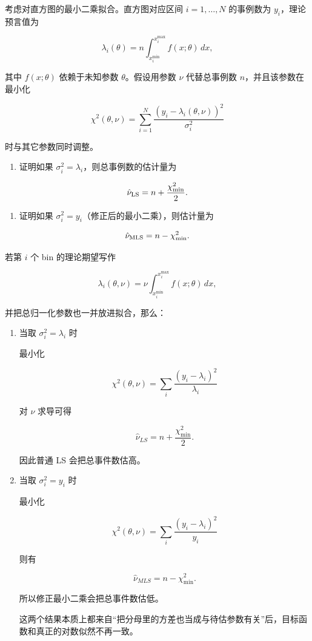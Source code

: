 \begin{question}
考虑对直方图的最小二乘拟合。直方图对应区间 \(i=1,\ldots,N\) 的事例数为
\(y_i\)，理论预言值为

\[
\lambda_i(\theta)=n\int_{x_i^{\min}}^{x_i^{\max}}f(x;\theta)\,dx,
\]

其中 \(f(x;\theta)\) 依赖于未知参数 \(\theta\)。假设用参数 \(\nu\)
代替总事例数 \(n\)，并且该参数在最小化

\[
\chi^2(\theta,\nu)=\sum_{i=1}^{N}\frac{(y_i-\lambda_i(\theta,\nu))^2}{\sigma_i^2}
\]

时与其它参数同时调整。

\begin{enumerate}
\item
  证明如果 \(\sigma_i^2=\lambda_i\)，则总事例数的估计量为
\end{enumerate}

\[
\hat\nu_{\rm LS}=n+\frac{\chi^2_{\min}}{2}.
\]

\begin{enumerate}[start=2]
\item
  证明如果 \(\sigma_i^2=y_i\)（修正后的最小二乘），则估计量为
\end{enumerate}

\[
\hat\nu_{\rm MLS}=n-\chi^2_{\min}.
\]
\begin{solution}
若第 \(i\) 个 bin 的理论期望写作

\[
\lambda_i(\theta,\nu)=\nu\int_{x_i^{\min}}^{x_i^{\max}} f(x;\theta)\,dx,
\]

并把总归一化参数也一并放进拟合，那么：

\begin{enumerate}
\item 当取 \(\sigma_i^2=\lambda_i\) 时

最小化

\[
\chi^2(\theta,\nu)=\sum_i\frac{(y_i-\lambda_i)^2}{\lambda_i}
\]

对 \(\nu\) 求导可得

\[
\hat\nu_{LS}=n+\frac{\chi^2_{\min}}{2}.
\]

因此普通 LS 会把总事件数估高。

\item 当取 \(\sigma_i^2=y_i\) 时

最小化

\[
\chi^2(\theta,\nu)=\sum_i\frac{(y_i-\lambda_i)^2}{y_i}
\]

则有

\[
\hat\nu_{MLS}=n-\chi^2_{\min}.
\]

所以修正最小二乘会把总事件数估低。

这两个结果本质上都来自``把分母里的方差也当成与待估参数有关''后，目标函数和真正的对数似然不再一致。
\end{enumerate}
\end{solution}
\end{question}



